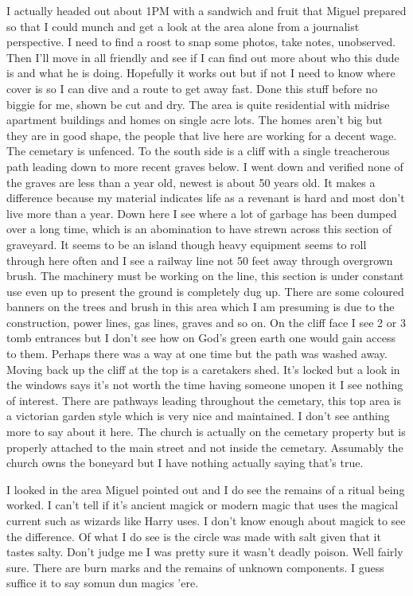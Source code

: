 I actually headed out about 1PM with a sandwich and fruit that Miguel prepared so that I could munch and get a look at the area alone from a journalist perspective. I need to find a roost to snap some photos, take notes, unobserved. Then I'll move in all friendly and see if I can find out more about who this dude is and what he is doing. Hopefully it works out but if not I need to know where cover is so I can dive and a route to get away fast. Done this stuff before no biggie for me, shown be cut and dry. The area is quite residential with midrise apartment buildings and homes on single acre lots. The homes aren't big but they are in good shape, the people that live here are working for a decent wage. The cemetary is unfenced. To the south side is a cliff with a single treacherous path leading down to more recent graves below. I went down and verified none of the graves are less than a year old, newest is about 50 years old. It makes a difference because my material indicates life as a revenant is hard and most don't live more than a year. Down here I see where a lot of garbage has been dumped over a long time, which is an abomination to have strewn across this section of graveyard. It seems to be an island though heavy equipment seems to roll through here often and I see a railway line not 50 feet away through overgrown brush. The machinery must be working on the line, this section is under constant use even up to present the ground is completely dug up. There are some coloured banners on the trees and brush in this area which I am presuming is due to the construction, power lines, gas lines, graves and so on. On the cliff face I see 2 or 3 tomb entrances but I don't see how on God's green earth one would gain access to them. Perhaps there was a way at one time but the path was washed away. Moving back up the cliff at the top is a caretakers shed. It's locked but a look in the windows says it's not worth the time having someone unopen it I see nothing of interest. There are pathways leading throughout the cemetary, this top area is a victorian garden style which is very nice and maintained. I don't see anthing more to say about it here. The church is actually on the cemetary property but is properly attached to the main street and not inside the cemetary. Assumably the church owns the boneyard but I have nothing actually saying that's true.

I looked in the area Miguel pointed out and I do see the remains of a ritual being worked. I can't tell if it's ancient magick or modern magic that uses the magical current such as wizards like Harry uses. I don't know enough about magick to see the difference. Of what I do see is the circle was made with salt given that it tastes salty. Don't judge me I was pretty sure it wasn't deadly poison. Well fairly sure. There are burn marks and the remains of unknown components. I guess suffice it to say somun dun magics 'ere.

